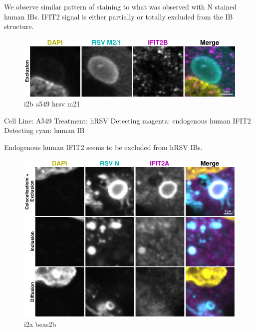 We observe similar pattern of staining to what was observed with N stained human IBs. IFIT2 signal is either partially or totally excluded from the IB structure.

\begin{figure}
    \centering
    \includegraphics[width=1\linewidth]{10. Chapter 5/Figs/01. Infection/06. i2b a549 hrsv m21.pdf}
    \caption[i2b a549 hrsv m21]{i2b a549 hrsv m21}
    \label{fig:i2b a549 hrsv m21}
\end{figure}

Cell Line: A549 \newline
Treatment: hRSV \newline
Detecting magenta: endogenous human IFIT2  \newline
Detecting cyan: human IB \newline

Endogenous human IFIT2 seems to be excluded from hRSV IBs.

\begin{figure}
    \centering
    \includegraphics[width=1\linewidth]{10. Chapter 5/Figs/01. Infection/07. i2a beas2b.pdf}
    \caption[i2a beas2b]{i2a beas2b}
    \label{fig:i2a beas2b}
\end{figure}

